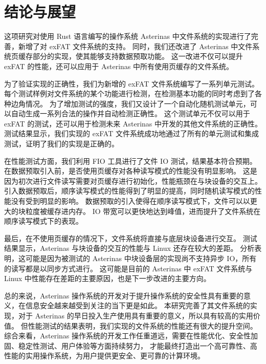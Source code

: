 
\chapter{结论与展望}
这项研究对使用 Rust 语言编写的操作系统 Asterinas 中文件系统的实现进行了完善，新增了对 exFAT 文件系统的支持。
同时，我们还改进了 Asterinas 中文件系统页缓存部分的实现，使其能够支持数据预取功能。
这一改进不仅可以提升 exFAT 的性能，还可以应用于 Asterinas 中所有使用页缓存的文件系统。

为了验证实现的正确性，我们为新增的 exFAT 文件系统编写了一系列单元测试。
每个测试样例对文件系统的某个功能进行检测，在检测基本功能的同时考虑到了各种边角情况。
为了增加测试的强度，我们又设计了一个自动化随机测试单元，可以自动生成一系列合法的操作并自动检测正确性。
这个测试单元不仅可以用于 exFAT 的测试，还可以用于检测未来 Asterinas 中开发的其他文件系统的正确性。
测试结果显示，我们实现的 exFAT 文件系统成功地通过了所有的单元测试和集成测试，证明了我们的实现是正确的。

在性能测试方面，我们利用 FIO 工具进行了文件 IO 测试，结果基本符合预期。
在数据预取引入前，是否使用页缓存对各种读写模式的性能没有明显影响。
这是因为初次进行文件读写需要对页缓存进行初始化，性能瓶颈在与块设备的交互上。
引入数据预取后，顺序读写模式的性能得到了明显的提高，同时随机读写模式的性能没有受到明显的影响。
数据预取的引入使得在顺序读写模式下，文件可以以更大的块粒度被缓存进内存。
IO 带宽可以更快地达到峰值，进而提升了文件系统在顺序读写模式下的表现。

最后，在不使用页缓存的情况下，文件系统将直接与底层块设备进行交互。
测试结果显示，Asterinas 与块设备的交互的性能与 Linux 还存在较大的差距。
分析表明，这可能是因为被测试的 Asterinas 中块设备层的实现尚不支持异步 IO，所有的读写都是以同步方式进行。
这可能是目前的 Asterinas 中 exFAT 文件系统与 Linux 中性能存在差距的主要原因，也是下一步改进的主要方向。

总的来说，Asterinas 操作系统的开发对于提升操作系统的安全性具有重要的意义，在信息安全越来越受到关注的当下更是如此。
本研究完善了其文件系统的实现，对于 Asterinas 的早日投入生产使用具有重要的意义，所以具有较高的实用价值。
但性能测试的结果表明，我们实现的文件系统的性能还有很大的提升空间。
综合来看，Asterinas 操作系统的开发工作任重道远，需要在性能优化、安全性加固、稳定性测试、用户体验等方面持续努力，
才能最终打造出一个高可靠性、高性能的实用操作系统，为用户提供更安全、更可靠的计算环境。


